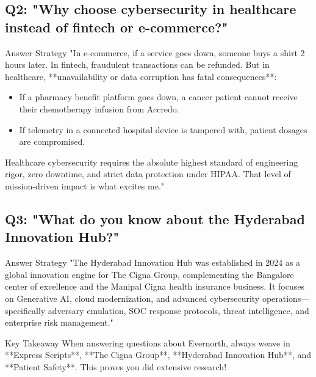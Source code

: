\documentclass[11pt,a4paper]{article}
\begin{document}
\subsection*{Q2: "Why choose cybersecurity in healthcare instead of fintech or e-commerce?"}
\begin{ansbox}{Answer Strategy}
"In e-commerce, if a service goes down, someone buys a shirt 2 hours later. In fintech, fraudulent transactions can be refunded. But in healthcare, **unavailability or data corruption has fatal consequences**:
\begin{itemize}
    \item If a pharmacy benefit platform goes down, a cancer patient cannot receive their chemotherapy infusion from Accredo.
    \item If telemetry in a connected hospital device is tampered with, patient dosages are compromised.
\end{itemize}
Healthcare cybersecurity requires the absolute highest standard of engineering rigor, zero downtime, and strict data protection under HIPAA. That level of mission-driven impact is what excites me."
\end{ansbox}

\subsection*{Q3: "What do you know about the Hyderabad Innovation Hub?"}
\begin{ansbox}{Answer Strategy}
"The Hyderabad Innovation Hub was established in 2024 as a global innovation engine for The Cigna Group, complementing the Bangalore center of excellence and the Manipal Cigna health insurance business. It focuses on Generative AI, cloud modernization, and advanced cybersecurity operations—specifically adversary emulation, SOC response protocols, threat intelligence, and enterprise risk management."
\end{ansbox}

\begin{trapbox}{Key Takeaway}
When answering questions about Evernorth, always weave in **Express Scripts**, **The Cigna Group**, **Hyderabad Innovation Hub**, and **Patient Safety**. This proves you did extensive research!
\end{trapbox}
\end{document}
